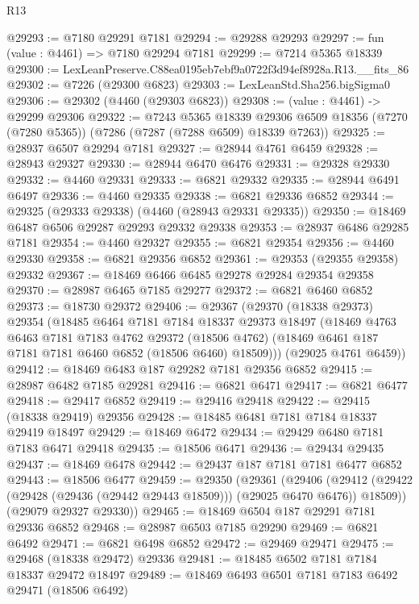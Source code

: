 \begin{lexlean}{R13}
\begin{coremodule}
@29293 := @7180 @29291 @7181
@29294 := @29288 @29293
@29297 := fun (value : @4461) => @7180 @29294 @7181
@29299 := @7214 @5365 @18339
@29300 := LexLeanPreserve.C88ea0195eb7ebf9a0722f3d94ef8928a.R13.__fits_86
@29302 := @7226 (@29300 @6823)
@29303 := LexLeanStd.Sha256.bigSigma0
@29306 := @29302 (@4460 (@29303 @6823))
@29308 := (value : @4461) -> @29299 @29306
@29322 := @7243
    @5365
    @18339
    @29306
    @6509
    @18356
    (@7270 (@7280 @5365))
    (@7286 (@7287 (@7288 @6509) @18339 @7263))
@29325 := @28937 @6507 @29294 @7181
@29327 := @28944 @4761 @6459
@29328 := @28943 @29327
@29330 := @28944 @6470 @6476
@29331 := @29328 @29330
@29332 := @4460 @29331
@29333 := @6821 @29332
@29335 := @28944 @6491 @6497
@29336 := @4460 @29335
@29338 := @6821 @29336 @6852
@29344 := @29325 (@29333 @29338) (@4460 (@28943 @29331 @29335))
@29350 := @18469 @6487 @6506 @29287 @29293 @29332 @29338
@29353 := @28937 @6486 @29285 @7181
@29354 := @4460 @29327
@29355 := @6821 @29354
@29356 := @4460 @29330
@29358 := @6821 @29356 @6852
@29361 := @29353 (@29355 @29358) @29332
@29367 := @18469 @6466 @6485 @29278 @29284 @29354 @29358
@29370 := @28987 @6465 @7185 @29277
@29372 := @6821 @6460 @6852
@29373 := @18730 @29372
@29406 := @29367
    (@29370
      (@18338 @29373)
      @29354
      (@18485
        @6464
        @7181
        @7184
        @18337
        @29373
        @18497
        (@18469
          @4763
          @6463
          @7181
          @7183
          @4762
          @29372
          (@18506 @4762)
          (@18469 @6461 @187 @7181 @7181 @6460 @6852 (@18506 @6460) @18509)))
      (@29025 @4761 @6459))
@29412 := @18469 @6483 @187 @29282 @7181 @29356 @6852
@29415 := @28987 @6482 @7185 @29281
@29416 := @6821 @6471
@29417 := @6821 @6477
@29418 := @29417 @6852
@29419 := @29416 @29418
@29422 := @29415 (@18338 @29419) @29356
@29428 := @18485 @6481 @7181 @7184 @18337 @29419 @18497
@29429 := @18469 @6472
@29434 := @29429 @6480 @7181 @7183 @6471 @29418
@29435 := @18506 @6471
@29436 := @29434 @29435
@29437 := @18469 @6478
@29442 := @29437 @187 @7181 @7181 @6477 @6852
@29443 := @18506 @6477
@29459 := @29350
    (@29361
      (@29406
        (@29412 (@29422 (@29428 (@29436 (@29442 @29443 @18509))) (@29025 @6470 @6476)) @18509))
      (@29079 @29327 @29330))
@29465 := @18469 @6504 @187 @29291 @7181 @29336 @6852
@29468 := @28987 @6503 @7185 @29290
@29469 := @6821 @6492
@29471 := @6821 @6498 @6852
@29472 := @29469 @29471
@29475 := @29468 (@18338 @29472) @29336
@29481 := @18485 @6502 @7181 @7184 @18337 @29472 @18497
@29489 := @18469 @6493 @6501 @7181 @7183 @6492 @29471 (@18506 @6492)

\end{coremodule}
\end{lexlean}
